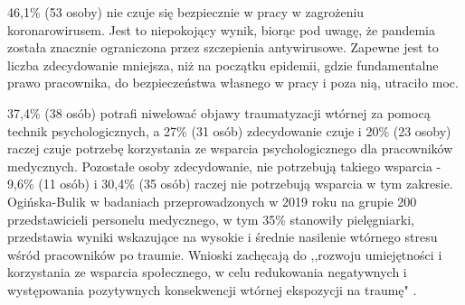 \documentclass[a4paper,12pt,twoside,openright]{mwrep}
\begin{document}
46,1\% (53 osoby) nie  czuje się bezpiecznie w pracy w zagrożeniu koronarowirusem. Jest to niepokojący wynik, biorąc pod uwagę, że pandemia została znacznie ograniczona przez szczepienia antywirusowe. Zapewne jest to liczba zdecydowanie mniejsza, niż na początku epidemii, gdzie fundamentalne prawo pracownika, do bezpieczeństwa własnego w pracy i poza nią, utraciło moc.

 37,4\% (38 osób) potrafi niwelować objawy traumatyzacji wtórnej za pomocą technik psychologicznych, a 27\% (31 osób) zdecydowanie czuje i 20\% (23 osoby) raczej czuje potrzebę korzystania ze wsparcia psychologicznego dla pracowników medycznych. Pozostałe osoby zdecydowanie, nie potrzebują takiego wsparcia - 9,6\%  (11 osób) i 30,4\% (35 osób) raczej nie potrzebują wsparcia w tym zakresie. Ogińska-Bulik w badaniach przeprowadzonych w 2019 roku na grupie 200 przedstawicieli personelu medycznego, w tym 35\% stanowiły pielęgniarki, przedstawia wyniki wskazujące na wysokie i średnie nasilenie wtórnego stresu wśród pracowników po traumie. Wnioski zachęcają do ,,rozwoju umiejętności i korzystania ze wsparcia społecznego, w celu redukowania negatywnych i występowania pozytywnych konsekwencji wtórnej ekspozycji na traumę" \cite{trauma}. 
\end{document}
